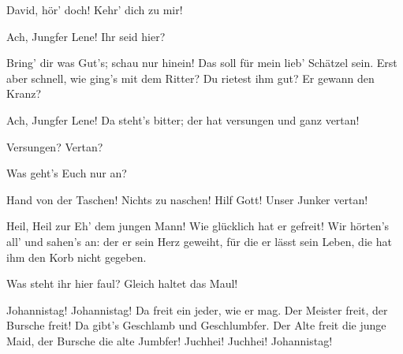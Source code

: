 \begin{drama}
\Magdalenespeaks
David, hör' doch! Kehr' dich zu mir!

\Davidspeaks
Ach, Jungfer Lene! Ihr seid hier?

\Magdalenespeaks


Bring' dir was Gut's; schau nur hinein!
Das soll für mein lieb' Schätzel sein.
Erst aber schnell, wie ging's mit dem Ritter?
Du rietest ihm gut? Er gewann den Kranz?

\Davidspeaks
Ach, Jungfer Lene! Da steht's bitter; der hat versungen und ganz vertan!

\Magdalenespeaks


Versungen? Vertan?

\Davidspeaks
Was geht's Euch nur an?

\Magdalenespeaks


Hand von der Taschen! Nichts zu naschen!
Hilf Gott! Unser Junker vertan!






Heil, Heil zur Eh' dem jungen Mann!
Wie glücklich hat er gefreit!
Wir hörten's all' und sahen's an:
der er sein Herz geweiht,
für die er lässt sein Leben,
die hat ihm den Korb nicht gegeben.

\Davidspeaks


Was steht ihr hier faul?
Gleich haltet das Maul!



Johannistag! Johannistag!
Da freit ein jeder, wie er mag.
Der Meister freit, der Bursche freit!
Da gibt's Geschlamb und Geschlumbfer.
Der Alte freit die junge Maid,
der Bursche die alte Jumbfer!
Juchhei! Juchhei! Johannistag!





\end{drama}
